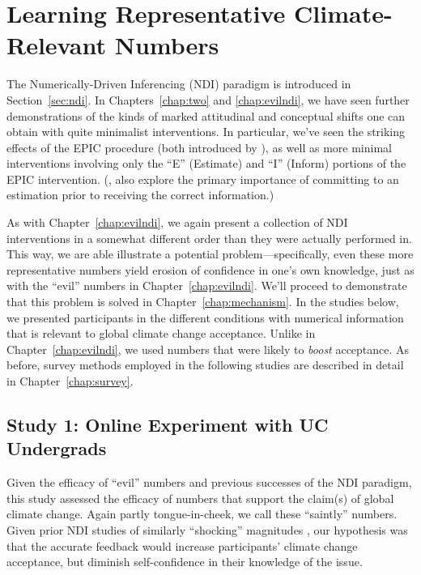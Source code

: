 \graphicspath{{pro-ndi/}}

\chapter{Learning Representative Climate-Relevant Numbers}
\label{chap:prondi}

The Numerically-Driven Inferencing (NDI) paradigm is introduced in Section~\ref{sec:ndi}.
In Chapters~\ref{chap:two} and \ref{chap:evilndi}, we have seen further
demonstrations of the kinds of marked attitudinal and conceptual shifts one can
obtain with quite minimalist interventions. In particular, we've seen the
striking effects of the EPIC procedure (both introduced by
), as well as more minimal
interventions involving only the “E” (Estimate) and “I” (Inform) portions of the
EPIC intervention. (, also explore the primary
importance of committing to an estimation prior to receiving the correct
information.)

As with Chapter~\ref{chap:evilndi}, we again present a collection of NDI
interventions in a somewhat different order than they were actually performed
in. This way, we are able illustrate a potential problem---specifically, even
these more representative numbers yield erosion
of confidence in one's own knowledge, just as with the “evil” numbers in
Chapter~\ref{chap:evilndi}. We'll proceed to demonstrate that this problem is solved in
Chapter~\ref{chap:mechanism}.  In the studies below, we presented participants
in the different conditions with numerical information that is relevant to
global climate change acceptance.  Unlike in Chapter~\ref{chap:evilndi}, we used
numbers that were likely to \emph{boost} acceptance. As before, survey methods employed
in the following studies are described in detail in Chapter~\ref{chap:survey}.

\section{Study 1: Online Experiment with UC Undergrads}
\label{sec:pro-uc}

Given the efficacy of “evil” numbers and previous successes of the NDI paradigm,
this study assessed the efficacy of numbers that support the claim(s) of global
climate change. Again partly tongue-in-cheek, we call these “saintly” numbers.
Given prior NDI studies of similarly “shocking” magnitudes
\parencite[e.g.,][]{garcia_de_osuna_qualitative_2004}, our hypothesis was that
the accurate feedback would increase participants’ climate change acceptance,
but diminish self-confidence in their knowledge of the issue.


